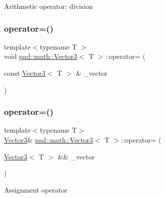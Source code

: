 Arithmetic operator\+: division \mbox{\label{structpad_1_1math_1_1_vector3_aabaa38eda86b1ebc0ad7b10ce3dd146e}} 
\subsubsection{\texorpdfstring{operator=()}{operator=()}\hspace{0.1cm}{\footnotesize\ttfamily [1/2]}}
{\footnotesize\ttfamily template$<$typename T $>$ \\
void \mbox{\hyperlink{structpad_1_1math_1_1_vector3}{pad\+::math\+::\+Vector3}}$<$ T $>$\+::operator= (\begin{DoxyParamCaption}\item[{const \mbox{\hyperlink{structpad_1_1math_1_1_vector3}{Vector3}}$<$ T $>$ \&}]{\+\_\+vector }\end{DoxyParamCaption})}

\mbox{\label{structpad_1_1math_1_1_vector3_af89a8db6bdfd4ce06a96e63021e9ed9a}} 
\subsubsection{\texorpdfstring{operator=()}{operator=()}\hspace{0.1cm}{\footnotesize\ttfamily [2/2]}}
{\footnotesize\ttfamily template$<$typename T$>$ \\
\mbox{\hyperlink{structpad_1_1math_1_1_vector3}{Vector3}}\& \mbox{\hyperlink{structpad_1_1math_1_1_vector3}{pad\+::math\+::\+Vector3}}$<$ T $>$\+::operator= (\begin{DoxyParamCaption}\item[{\mbox{\hyperlink{structpad_1_1math_1_1_vector3}{Vector3}}$<$ T $>$ \&\&}]{\+\_\+vector }\end{DoxyParamCaption})\hspace{0.3cm}{\ttfamily [default]}}

Assignment operator \mbox{\label{structpad_1_1math_1_1_vector3_a8366aa2e0deb2f3581c9aa8e9d8838f6}} 

